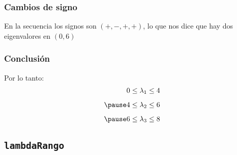\documentclass[12pt]{beamer}
\begin{document}
\begin{frame}
\frametitle{Cambios de signo}
En la secuencia los signos son $(+, -, +, +)$, \pause lo que nos dice que hay dos eigenvalores en $(0, 6)$
\end{frame}
\begin{frame}
\frametitle{Conclusión}
Por lo tanto:
\begin{eqnarray*}
\begin{aligned}
0 \leq \lambda_{1} \leq 4 \\[0.5em] \pause
4 \leq \lambda_{2} \leq 6 \\[0.5em] \pause
6 \leq \lambda_{3} \leq 8
\end{aligned}
\end{eqnarray*}
\end{frame}

\subsection{\texttt{lambdaRango}}
\end{document}
